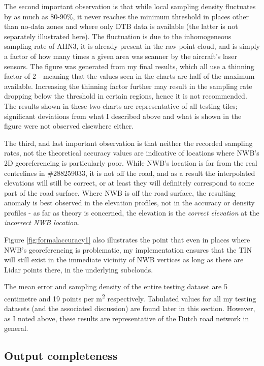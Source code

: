 The second important observation is that while local sampling density fluctuates by as much as 80-90\%, it never reaches the minimum threshold in places other than no-data zones and where only DTB data is available (the latter is not separately illustrated here). The fluctuation is due to the inhomogeneous sampling rate of AHN3, it is already present in the raw point cloud, and is simply a factor of how many times a given area was scanner by the aircraft's laser sensors. The figure was generated from my final results, which all use a thinning factor of 2 - meaning that the values seen in the charts are half of the maximum available. Increasing the thinning factor further may result in the sampling rate dropping below the threshold in certain regions, hence it is not recommended. The results shown in these two charts are representative of all testing tiles; significant deviations from what I described above and what is shown in the figure were not observed elsewhere either.

The third, and last important observation is that neither the recorded sampling rates, not the theoretical accuracy values are indicative of locations where NWB's 2D georeferencing is particularly poor. While NWB's location is far from the real centrelines in \#288259033, it is not off the road, and as a result the interpolated elevations will still be correct, or at least they will definitely correspond to some part of the road surface. Where NWB is off the road surface, the resulting anomaly is best observed in the elevation profiles, not in the accuracy or density profiles - as far as theory is concerned, the elevation is the \textit{correct elevation} at the \textit{incorrect NWB location}.

Figure \ref{fig:formalaccuracy1} also illustrates the point that even in places where NWB's georeferencing is problematic, my implementation ensures that the TIN will still exist in the immediate vicinity of NWB vertices as long as there are Lidar points there, in the underlying subclouds.

The mean error and sampling density of the entire testing dataset are 5 centimetre and 19 points per m\textsuperscript{2} respectively. Tabulated values for all my testing datasets (and the associated discussion) are found later in this section. However, as I noted above, these results are representative of the Dutch road network in general.

\subsection{Output completeness}
\label{sub:completeness}


